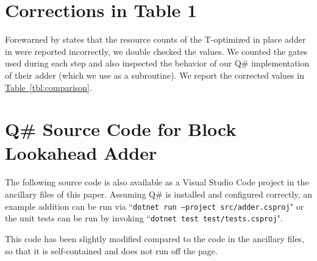 \documentclass[onecolumn,unpublished]{quantumarticle}
\theoremstyle{definition}
\theoremstyle{definition}
\theoremstyle{definition}
\newcommand{\tbl}[1]{\hyperref[tbl:#1]{Table~\ref*{tbl:#1}}}
\begin{document}



\appendix

\section{Corrections in Table 1}
\label{app:correction}

Forewarned by \cite{oonishi2020efficient} states that the resource counts of the T-optimized in place adder in \cite{thapliyal2020lookahead} were reported incorrectly, we double checked the values.
We counted the gates used during each step and also inspected the behavior of our Q\# implementation of their adder (which we use as a subroutine).
We report the corrected values in \tbl{comparison}.

\section{Q\# Source Code for Block Lookahead Adder}
\label{app:blockadder}

The following source code is also available as a Visual Studio Code project in the ancillary files of this paper.
Assuming Q\# is installed and configured correctly, an example addition can be run via ``\texttt{dotnet run --project src/adder.csproj}" or the unit tests can be run by invoking ``\texttt{dotnet test test/tests.csproj}".

This code has been slightly modified compared to the code in the ancillary files, so that it is self-contained and does not run off the page.
\end{document}

